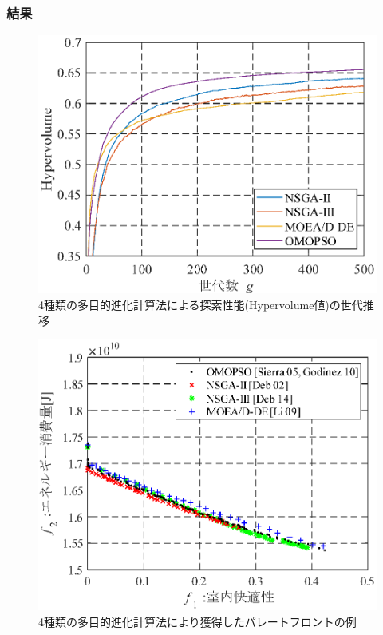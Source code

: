 \subsubsection{結果}
\begin{figure}[htbp]
  \begin{center}
    \includegraphics[width=0.7\linewidth]{fig/sim_result_hv_multi.eps}
  \end{center}
  \caption{4種類の多目的進化計算法による探索性能(Hypervolume値)の世代推移}
  \vspace{-6mm}
  \label{fig::sim_result_hv_multi}
\end{figure}

\begin{figure}[htbp]
  \begin{center}
    \includegraphics[width=0.7\linewidth]{fig/sim_result_pareto_multi.eps}
  \end{center}
  \caption{4種類の多目的進化計算法により獲得したパレートフロントの例}
  \vspace{-6mm}
  \label{fig::sim_result_pareto_multi}
\end{figure}

